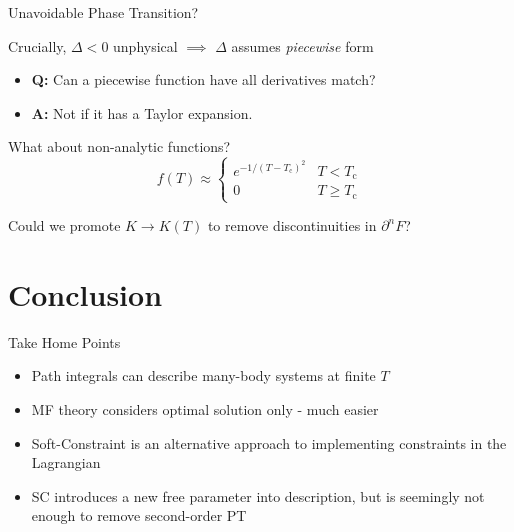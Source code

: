 \documentclass[13pt]{beamer}
\begin{document}
  \begin{frame}{Unavoidable Phase Transition?}

  Crucially, $ \Delta < 0 $ unphysical $ \implies $ $ \Delta $ assumes \emph{piecewise} form

    \begin{itemize}
      \item \textbf{Q:} Can a piecewise function have all derivatives match?
      \item \textbf{A:} Not if it has a Taylor expansion.
    \end{itemize}

  \begin{exampleblock}{What about non-analytic functions?}
    $$ f(T) \approx 
    \begin{cases}
    e^{- 1 / (T - T_{\text{c}})^2} & T < T_{\text{c}} \\
    0 & T \geq T_{\text{c}}
    \end{cases} $$
  \end{exampleblock}

  Could we promote $ K \rightarrow K(T) $ to remove discontinuities in $ \partial^n F $?

  \end{frame}




  \section{Conclusion}

  \begin{frame}{Take Home Points}

  \begin{itemize}
    \item Path integrals can describe many-body systems at finite $ T $
    \item MF theory considers optimal solution only - much easier
    \item Soft-Constraint is an alternative approach to implementing constraints in the Lagrangian
    \item SC introduces a new free parameter into description, but is seemingly not enough to remove second-order PT
  \end{itemize}

  \end{frame}
\end{document}
